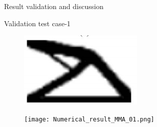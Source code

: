 \documentclass[a4paper,12pt,times]{article}
\begin{document}
\begin{section}{Result validation and discussion}
\begin{subsection}{Validation test case-1}
\begin{figure}[H]
	\centering
	\begin{minipage}{.5\textwidth}
		\centering
		\includegraphics[width=1\linewidth]{analytical_1.png}
		\label{VC-01.1}
	\end{minipage}%
	\begin{minipage}{.5\textwidth}
		\centering
		\texttt{[image: Numerical\_result\_MMA\_01.png]}
		\label{VC-01.2}
	\end{minipage}
\end{figure} 



\end{subsection}
\end{section}
\end{document}
